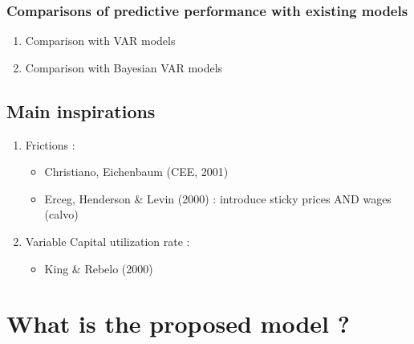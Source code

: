 \documentclass{article}
\begin{document}
\subsubsection{Comparisons of predictive performance with existing models}
\begin{enumerate}
    \item Comparison with VAR models  
    \item Comparison with Bayesian VAR models 
\end{enumerate}

\subsection{Main inspirations}
\begin{enumerate}
    \item Frictions : 
    \begin{itemize}
        \item Christiano, Eichenbaum (CEE, 2001)  
        \item Erceg, Henderson \& Levin (2000) : introduce sticky prices AND wages (calvo)
    \end{itemize} 
    \item Variable Capital utilization rate :
    \begin{itemize}
        \item King \& Rebelo (2000)
    \end{itemize}
\end{enumerate}




\section{What is the proposed model ?}
\end{document}
